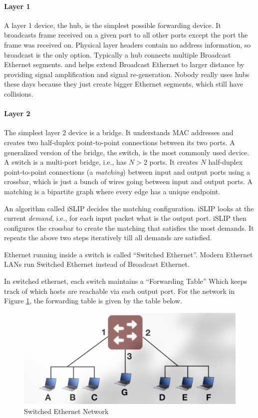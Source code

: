 \paragraph{Layer 1} A layer 1 device, the hub, is the simplest possible
forwarding device. It broadcasts frame received on a given port to all
other ports except the port the frame was received on.
Physical layer headers contain no address information, so broadcast is
the only option. Typically a hub connects multiple Broadcast Ethernet segments.
and helps extend Broadcast Ethernet to larger distance
by providing signal amplification and signal re-generation. Nobody really uses
hubs these days because they just create bigger Ethernet segments,
which still have collisions.

\paragraph{Layer 2} The simplest layer 2 device is a bridge. It understands
MAC addresses and creates two half-duplex point-to-point connections
between its two ports. A generalized version of the bridge, the switch,
is the most commonly used device. A switch is a multi-port bridge, i.e.,
has $N > 2$ ports. It creates $N$ half-duplex point-to-point connections
(a \emph{matching}) between input and output ports using a crossbar,
which is just a bunch of wires going between input and output ports.
A matching is a bipartite graph
where every edge has a unique endpoint.

An algorithm
called iSLIP decides the matching configuration.
iSLIP looks at the current \emph{demand}, i.e., for each input packet
what is the output port.
iSLIP then configures the crossbar to create the matching that satisfies
the most demands.
It repeats the above two steps iteratively till all demands are satisfied.

Ethernet running inside a switch is called “Switched Ethernet”.
Modern Ethernet LANs run Switched Ethernet
instead of Broadcast Ethernet.

In switched ethernet, each switch maintains a “Forwarding Table”
Which keeps track of which hosts are reachable via each output port.
For the network in Figure \ref{fig:switchedethernetnetwork}, the
forwarding table is given by the table below.
\begin{figure}
    \includegraphics{images/switchedethernetnetwork.png}
    \caption{Switched Ethernet Network}
    \label{fig:switchedethernetnetwork}
\end{figure}

